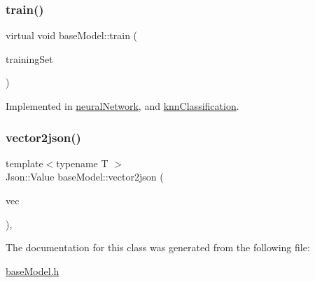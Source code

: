 \subsubsection{\texorpdfstring{train()}{train()}}
{\footnotesize\ttfamily virtual void base\+Model\+::train (\begin{DoxyParamCaption}\item[{const std\+::vector$<$ \hyperlink{structtraining_example}{training\+Example} $>$ \&}]{training\+Set }\end{DoxyParamCaption})\hspace{0.3cm}{\ttfamily [pure virtual]}}



Implemented in \hyperlink{classneural_network_af0da201b2b09bef38471f5ceaca7c2ea}{neural\+Network}, and \hyperlink{classknn_classification_a04ce32741a132d39839d33d0d79e6c8f}{knn\+Classification}.

\mbox{\label{classbase_model_a853d3a2d610c43fca37676ac1459e3b9}} 
\subsubsection{\texorpdfstring{vector2json()}{vector2json()}}
{\footnotesize\ttfamily template$<$typename T $>$ \\
Json\+::\+Value base\+Model\+::vector2json (\begin{DoxyParamCaption}\item[{T}]{vec }\end{DoxyParamCaption})\hspace{0.3cm}{\ttfamily [inline]}, {\ttfamily [protected]}}



The documentation for this class was generated from the following file\+:\begin{DoxyCompactItemize}
\item 
\hyperlink{base_model_8h}{base\+Model.\+h}\end{DoxyCompactItemize}
